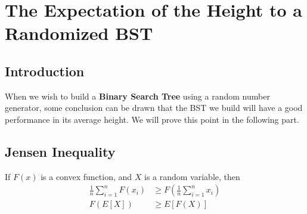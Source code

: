\documentclass[15pt]{article}
\begin{document}
\section{The Expectation of the Height to a Randomized BST }
\subsection{Introduction}
When we wish to build a \textbf{Binary Search Tree} using a random number generator, some conclusion can be drawn that the BST we build will have a good performance in its average height. We will prove this point in the following part.
\subsection{Jensen Inequality}
If $F(x)$ is a convex function, and $X$ is a random variable, then
\begin{equation}
\begin{aligned}
    \frac{1}{n}\sum_{i=1}^{n}F(x_i) &\geq F(\frac{1}{n}\sum_{i=1}^{n} x_i) \\
    F(E[X]) &\geq E[F(X)]
\end{aligned}
\end{equation}
\end{document}
